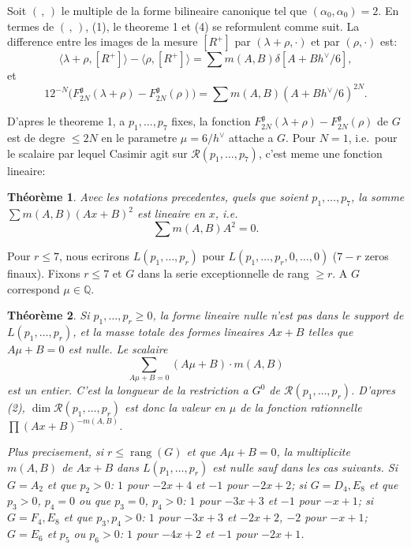 \documentclass[11pt,a4paper]{article}
\theoremstyle{plain}
\newtheorem{theorem}{Th\'eor\`eme}
\theoremstyle{definition}
\DeclareMathOperator{\rank}{rang}
\newcommand{\rang}{\rank}
\begin{document}
Soit $(\, , \,)$ le multiple de la forme bilineaire canonique tel que $(\alpha_0,\alpha_0) = 2$. En termes de $(\, , \,)$, (1), le theoreme 1 et (4) se reformulent comme suit. La difference entre les images de la mesure $[R^+]$ par $(\lambda + \rho, \cdot)$ et par $(\rho, \cdot)$ est:
\begin{equation}\label{eq:5}
\langle \lambda + \rho, [R^+] \rangle - \langle \rho, [R^+] \rangle = \sum m(A,B)\delta[A + Bh^\vee/6],
\end{equation}
et
\begin{equation}\label{eq:6}
12^{-N} \bigl(F_{2N}^{\mathfrak{g}}(\lambda + \rho) - F_{2N}^{\mathfrak{g}}(\rho)\bigr) = \sum m(A,B)(A + Bh^\vee/6)^{2N}.
\end{equation}

D'apres le theoreme 1, a $p_1,\dots,p_7$ fixes, la fonction $F_{2N}^{\mathfrak{g}}(\lambda + \rho) - F_{2N}^{\mathfrak{g}}(\rho)$ de $G$ est de degre $\leq 2N$ en le parametre $\mu = 6/h^\vee$ attache a $G$. Pour $N = 1$, i.e.\ pour le scalaire par lequel Casimir agit sur $\mathcal{R}(p_1,\dots,p_7)$, c'est meme une fonction lineaire:

\begin{theorem}\label{thm:2}
Avec les notations precedentes, quels que soient $p_1,\dots,p_7$, la somme $\sum m(A,B)(Ax + B)^2$ est lineaire en $x$, i.e.
\begin{equation}\label{eq:7}
\sum m(A,B) A^2 = 0.
\end{equation}
\end{theorem}

Pour $r \leq 7$, nous ecrirons $L(p_1,\dots,p_r)$ pour $L(p_1,\dots,p_r,0,\dots,0)$ ($7-r$ zeros finaux). Fixons $r \leq 7$ et $G$ dans la serie exceptionnelle de rang $\geq r$. A $G$ correspond $\mu \in \mathbb{Q}$.

\begin{theorem}\label{thm:3}
Si $p_1,\dots,p_r \geq 0$, la forme lineaire nulle n'est pas dans le support de $L(p_1,\dots,p_r)$, et la masse totale des formes lineaires $Ax + B$ telles que $A\mu + B = 0$ est nulle. Le scalaire
\[
\sum_{A\mu + B = 0} (A\mu + B) \cdot m(A,B)
\]
est un entier. C'est la longueur de la restriction a $G^0$ de $\mathcal{R}(p_1,\dots,p_r)$. D'apres (2), $\dim \mathcal{R}(p_1,\dots,p_r)$ est donc la valeur en $\mu$ de la fonction rationnelle $\prod (Ax + B)^{-m(A,B)}$.

Plus precisement, si $r \leq \rang(G)$ et que $A\mu + B = 0$, la multiplicite $m(A,B)$ de $Ax + B$ dans $L(p_1,\dots,p_r)$ est nulle sauf dans les cas suivants. Si $G = A_2$ et que $p_2 > 0$: $1$ pour $-2x + 4$ et $-1$ pour $-2x + 2$; si $G = D_4, E_8$ et que $p_3 > 0$, $p_4 = 0$ ou que $p_3 = 0$, $p_4 > 0$: $1$ pour $-3x + 3$ et $-1$ pour $-x + 1$; si $G = F_4, E_8$ et que $p_3, p_4 > 0$: $1$ pour $-3x + 3$ et $-2x + 2$, $-2$ pour $-x + 1$; $G = E_6$ et $p_5$ ou $p_6 > 0$: $1$ pour $-4x + 2$ et $-1$ pour $-2x + 1$.
\end{theorem}
\end{document}
